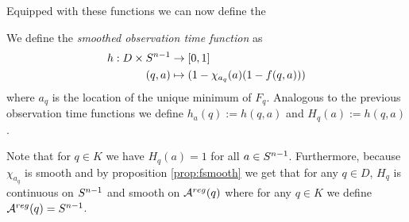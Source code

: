 Equipped with these functions we can now define the
\begin{definition}
    We define the \emph{smoothed observation time function} as 
    \begin{align*}
        h:D\times {S^{n-1}} &\to [0,1] \\
        (q,a)&\mapsto (1-\chi_{a_q}(a)(1-f(q,a)))
    \end{align*}
    where $a_q$ is the location of the unique minimum of $F_q$.
    Analogous to the previous observation time functions we define $h_a(q):=h(q,a)$ and $H_q(a):=h(q,a)$.
\end{definition}
\begin{remark}
    Note that for $q\in K$ we have $H_q(a)=1$ for all $a\in {S^{n-1}}$. Furthermore, because $\chi_{a_q}$ is smooth and by proposition \ref{prop:fsmooth} we get that for any $q\in D$, $H_q$ is continuous on ${S^{n-1}}$ and smooth on ${{\mathcal{A}}^{reg}}(q)$ where for any $q\in K$ we define ${{\mathcal{A}}^{reg}}(q)={S^{n-1}}$.
\end{remark}

